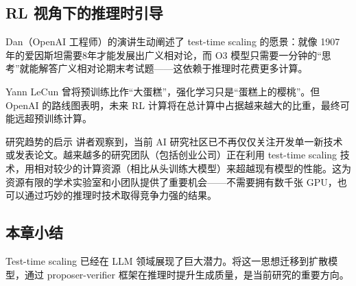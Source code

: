 \subsection{RL 视角下的推理时引导}

Dan（OpenAI 工程师）的演讲生动阐述了 test-time scaling 的愿景：就像 1907 年的爱因斯坦需要8年才能发展出广义相对论，而 O3 模型只需要一分钟的``思考''就能解答广义相对论期末考试题——这依赖于推理时花费更多计算。

Yann LeCun 曾将预训练比作``大蛋糕''，强化学习只是``蛋糕上的樱桃''。但 OpenAI 的路线图表明，未来 RL 计算将在总计算中占据越来越大的比重，最终可能远超预训练计算。

\begin{warningbox}{研究趋势的启示}
讲者观察到，当前 AI 研究社区已不再仅仅关注开发单一新技术或发表论文。越来越多的研究团队（包括创业公司）正在利用 test-time scaling 技术，用相对较少的计算资源（相比从头训练大模型）来超越现有模型的性能。这为资源有限的学术实验室和小团队提供了重要机会——不需要拥有数千张 GPU，也可以通过巧妙的推理时技术取得竞争力强的结果。
\end{warningbox}

\subsection{本章小结}

Test-time scaling 已经在 LLM 领域展现了巨大潜力。将这一思想迁移到扩散模型，通过 proposer-verifier 框架在推理时提升生成质量，是当前研究的重要方向。

